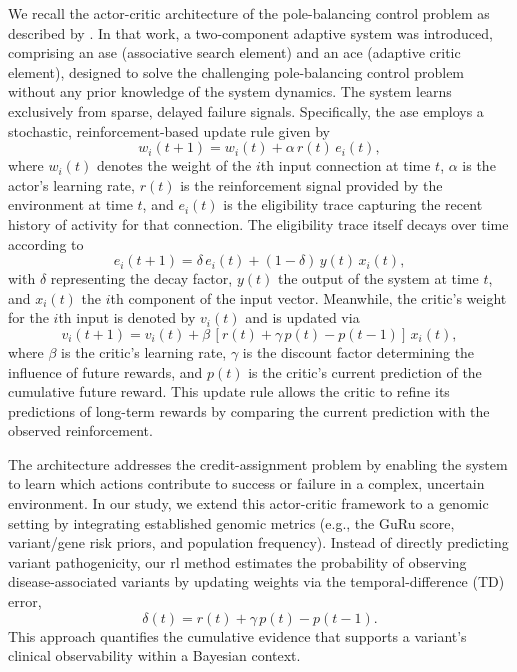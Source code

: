 We recall the actor-critic architecture of the pole-balancing control problem as described by \citet{barto1983neuronlike, barto2020looking}. %
In that work, a two-component adaptive system was introduced, comprising an \ac{ase} (associative search element) and an \ac{ace} (adaptive critic element), designed to solve the challenging pole-balancing control problem without any prior knowledge of the system dynamics. The system learns exclusively from sparse, delayed failure signals. Specifically, the \ac{ase} employs a stochastic, reinforcement-based update rule given by
\[
w_i(t+1) = w_i(t) + \alpha\, r(t)\, e_i(t),
\]
where \(w_i(t)\) denotes the weight of the \(i\)th input connection at time \(t\), \(\alpha\) is the actor’s learning rate, \(r(t)\) is the reinforcement signal provided by the environment at time \(t\), and \(e_i(t)\) is the eligibility trace capturing the recent history of activity for that connection. %
The eligibility trace itself decays over time according to
\[
e_i(t+1) = \delta\, e_i(t) + (1-\delta)\, y(t)\, x_i(t),
\]
with \(\delta\) representing the decay factor, \(y(t)\) the output of the system at time \(t\), and \(x_i(t)\) the \(i\)th component of the input vector. %
Meanwhile, the critic's weight for the \(i\)th input is denoted by \(v_i(t)\) and is updated via
\[
v_i(t+1) = v_i(t) + \beta\,[r(t) + \gamma\, p(t) - p(t-1)]\, x_i(t),
\]
where \(\beta\) is the critic’s learning rate, \(\gamma\) is the discount factor determining the influence of future rewards, and \(p(t)\) is the critic's current prediction of the cumulative future reward. This update rule allows the critic to refine its predictions of long-term rewards by comparing the current prediction with the observed reinforcement.

The architecture addresses the credit-assignment problem by enabling the system to learn which actions contribute to success or failure in a complex, uncertain environment. %
In our study, we extend this actor-critic framework to a genomic setting by integrating established genomic metrics (e.g., the GuRu score, variant/gene risk priors, and population frequency). Instead of directly predicting variant pathogenicity, our \ac{rl} method estimates the probability of observing disease-associated variants by updating weights via the temporal-difference (TD) error,
\[
\delta(t)=r(t)+\gamma\, p(t)-p(t-1).
\]
This approach quantifies the cumulative evidence that supports a variant’s clinical observability within a Bayesian context. 

